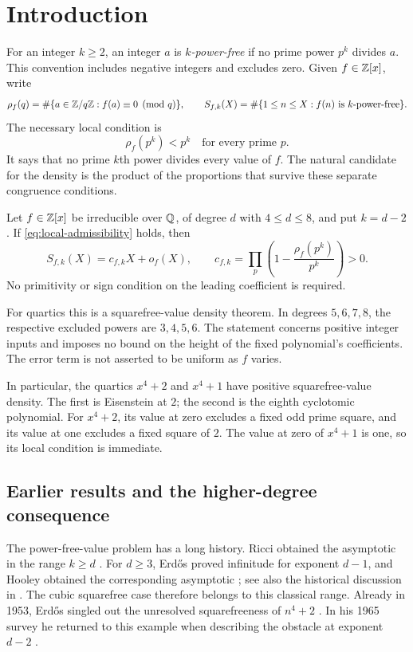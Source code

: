 \section{Introduction}
\label{sec:introduction}

For an integer $k\ge2$, an integer $a$ is \emph{$k$-power-free} if no prime
power $p^k$ divides $a$. This convention includes negative integers and
excludes zero. Given $f\in\mathbb Z[x]$, write
\[
 \rho_f(q)=\#\{a\in\mathbb Z/q\mathbb Z:f(a)\equiv0\pmod q\},\qquad
 S_{f,k}(X)=\#\{1\le n\le X:f(n)\text{ is $k$-power-free}\}.
\]
The necessary local condition is
\begin{equation}
 \rho_f(p^k)<p^k\quad\text{for every prime }p.
 \label{eq:local-admissibility}
\end{equation}
It says that no prime $k$th power divides every value of $f$. The natural
candidate for the density is the product of the proportions that survive
these separate congruence conditions.

\begin{theorem}\label{thm:density}
Let $f\in\mathbb Z[x]$ be irreducible over $\mathbb Q$, of degree $d$ with
$4\le d\le8$, and put $k=d-2$. If \eqref{eq:local-admissibility} holds,
then
\[
 S_{f,k}(X)=c_{f,k}X+o_f(X),\qquad
 c_{f,k}=\prod_p\left(1-\frac{\rho_f(p^k)}{p^k}\right)>0.
\]
No primitivity or sign condition on the leading coefficient is required.
\end{theorem}

For quartics this is a squarefree-value density theorem. In degrees
$5,6,7,8$, the respective excluded powers are $3,4,5,6$.
The statement concerns positive integer inputs and imposes no bound on
the height of the fixed polynomial's coefficients. The error term is not
asserted to be uniform as $f$ varies.

In particular, the quartics $x^4+2$ and $x^4+1$ have positive squarefree-value
density. The first is Eisenstein at $2$; the second is the eighth cyclotomic
polynomial. For $x^4+2$, its value at zero excludes a fixed odd prime square,
and its value at one excludes a fixed square of $2$. The value at zero
of $x^4+1$ is one, so its local condition is immediate.

\subsection{Earlier results and the higher-degree consequence}

The power-free-value problem has a long history. Ricci obtained
the asymptotic in the range $k\ge d$ \cite{Ricci1933}.
For $d\ge3$, Erd\H{o}s proved infinitude for exponent $d-1$, and Hooley obtained
the corresponding asymptotic \cite{Erdos1953,Hooley1967}; see also
the historical discussion in \cite[Introduction]{HeathBrown2013Powerfree}.
The cubic squarefree case therefore belongs to this classical range.
Already in 1953, Erd\H{o}s singled out the unresolved squarefreeness
of $n^4+2$ \cite[p.~425]{Erdos1953}. In his 1965 survey he returned
to this example when describing the obstacle at exponent $d-2$
\cite[Section~6, p.~219]{Erdos1965}.

